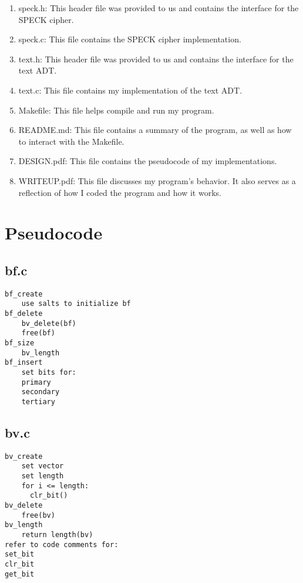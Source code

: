 \documentclass[12pt]{article}
\begin{document}
\begin{enumerate}
    \item speck.h: This header file was provided to us and contains the interface for the SPECK cipher.
    \item speck.c: This file contains the SPECK cipher implementation.
    \item text.h: This header file was provided to us and contains the interface for the text ADT.
    \item text.c: This file contains my implementation of the text ADT.
    \item Makefile: This file helps compile and run my program.
    \item README.md: This file contains a summary of the program, as well as how to interact with the Makefile.
    \item DESIGN.pdf: This file contains the pseudocode of my implementations.
    \item WRITEUP.pdf: This file discusses my program's behavior. It also serves as a reflection of how I coded the program and how it works.
\end{enumerate}

\section{Pseudocode}\label{ss:pseudocode}
\subsection{\textbf{bf.c}}
\begin{verbatim}
bf_create
    use salts to initialize bf
bf_delete 
    bv_delete(bf)
    free(bf)
bf_size
    bv_length
bf_insert
    set bits for:
    primary
    secondary
    tertiary
\end{verbatim}

\subsection{\textbf{bv.c}}
\begin{verbatim}
bv_create
    set vector
    set length
    for i <= length:
      clr_bit()
bv_delete
    free(bv)
bv_length
    return length(bv)
refer to code comments for:
set_bit
clr_bit
get_bit
\end{verbatim}
\end{document}
